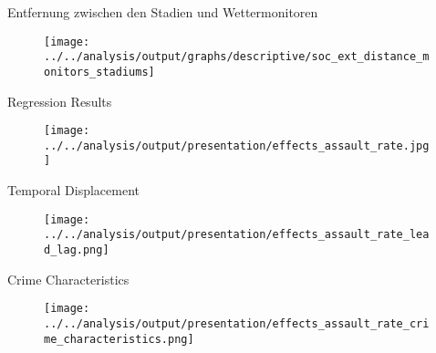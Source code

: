 \documentclass[usenames,dvipsnames,ngerman]{beamer} %
\begin{document}
	\begin{frame}{Entfernung zwischen den Stadien und Wettermonitoren}\label{link_hist_dist_monitor_stadiums}
		\hyperlink{link_weather_data}{}
		\begin{figure}
			\texttt{[image: ../../analysis/output/graphs/descriptive/soc\_ext\_distance\_monitors\_stadiums]}
		\end{figure}
	\end{frame}



	\begin{frame}{Regression Results}\label{link_regression_baseline}
		\begin{figure}
			\texttt{[image: ../../analysis/output/presentation/effects\_assault\_rate.jpg]}
		\end{figure}
		\hyperlink{link_regression_victim_characteristic}{}
	\end{frame}

	\begin{frame}{Temporal Displacement}\label{link_regression_lead_lags}
		\begin{figure}
			\texttt{[image: ../../analysis/output/presentation/effects\_assault\_rate\_lead\_lag.png]}
		\end{figure}
		\hyperlink{link_regression_victim_characteristic}{}
	\end{frame}

	\begin{frame}{Crime Characteristics}\label{link_regression_crime_characteristics}
		\begin{figure}
			\texttt{[image: ../../analysis/output/presentation/effects\_assault\_rate\_crime\_characteristics.png]}
		\end{figure}
		\hyperlink{link_regression_victim_characteristic}{}
	\end{frame}
\end{document}
